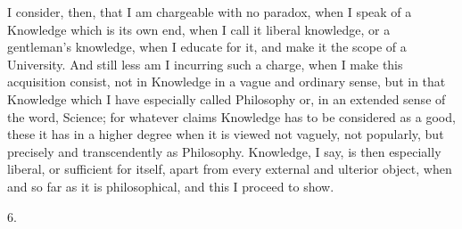 I consider, then, that I am chargeable with no paradox, when I
speak of a Knowledge which is its own end, when I call it liberal
knowledge, or a gentleman's knowledge, when I educate for it, and make
it the scope of a University. And still less am I incurring such a
charge, when I make this acquisition consist, not in Knowledge in a
vague and ordinary sense, but in that Knowledge which I have
especially called Philosophy or, in an extended sense of the word,
Science; for whatever claims Knowledge has to be considered as a good,
these it has in a higher degree when it is viewed not vaguely, not
popularly, but precisely and transcendently as Philosophy. Knowledge,
I say, is then especially liberal, or sufficient for itself, apart
from every external and ulterior object, when and so far as it is
philosophical, and this I proceed to show.

6.

